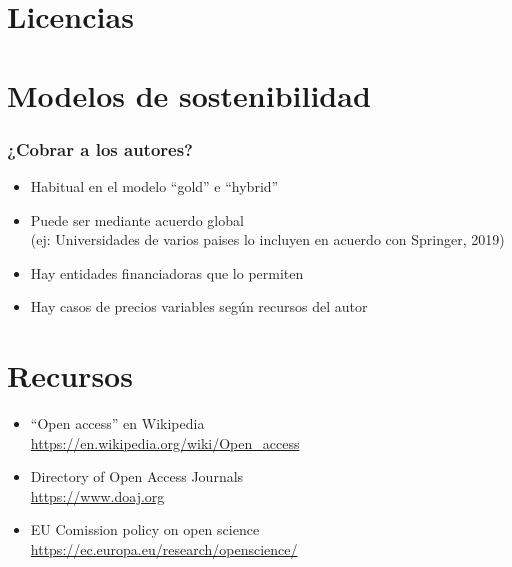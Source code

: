 \documentclass[17pt,aspectratio=169]{beamer}
\begin{document}
\section{Licencias}

\section{Modelos de sostenibilidad}

\begin{frame}
\frametitle{¿Cobrar a los autores?}

\begin{itemize}
\item Habitual en el modelo ``gold'' e ``hybrid''
\item Puede ser mediante acuerdo global \\
  (ej: Universidades de varios paises lo incluyen en acuerdo con Springer, 2019)
\item Hay entidades financiadoras que lo permiten
\item Hay casos de precios variables según recursos del autor
\end{itemize}

\end{frame}

\section{Recursos}

\begin{frame}

  \begin{itemize}
  \item ``Open access'' en Wikipedia \\
    {\small \url{https://en.wikipedia.org/wiki/Open_access}}
  \item Directory of Open Access Journals \\
    {\small \url{https://www.doaj.org}}
  \item EU Comission policy on open science \\
    {\small \url{https://ec.europa.eu/research/openscience/}}
  \end{itemize}

\end{frame}
\end{document}
